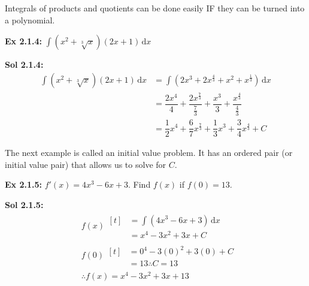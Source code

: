 Integrals of products and quotients can be done easily IF they can be turned into a polynomial. \par

\begin{tcolorbox}[example]
    \textbf{Ex 2.1.4: } $\int \left(x^2 + \sqrt[3]{x}\right)(2x + 1) \,\mathrm{d}x$
\end{tcolorbox}
\begin{tcolorbox}[solution]
    \textbf{Sol 2.1.4: } \begin{align*}
        \int \left(x^2 + \sqrt[3]{x}\right)(2x + 1) \,\mathrm{d}x &= \int \left(2x^3 + 2x^{\frac{4}{3}} + x^2 + x^{\frac{1}{3}}\right) \,\mathrm{d}x \\[11pt]
        & = \dfrac{2x^4}{4} + \dfrac{2x^{\frac{7}{3}}}{\frac{7}{3}} + \dfrac{x^3}{3} + \dfrac{x^{\frac{4}{3}}}{\frac{4}{3}} \\[11pt]
        & = \boxed{\dfrac{1}{2}x^4 + \dfrac{6}{7}x^{\frac{7}{3}} + \dfrac{1}{3}x^3 + \dfrac{3}{4}x^{\frac{4}{3}} + C}
    \end{align*}
\end{tcolorbox}

The next example is called an initial value problem. It has an ordered pair (or initial value pair) that allows us to solve for $C$. \par

\begin{tcolorbox}[example]
    \textbf{Ex 2.1.5: } $f'(x) = 4x^3 - 6x + 3$. Find $f(x)$ if $f(0) = 13$.
\end{tcolorbox} 
\begin{tcolorbox}[solution]
    \textbf{Sol 2.1.5: } \begin{align*}
        & f(x) \begin{aligned}[t]
            & = \int \left(4x^3 - 6x + 3\right) \,\mathrm{d}x \\[11pt]
            & = x^4 - 3x^2 + 3x + C 
        \end{aligned} \\[11pt]
        & f(0) \begin{aligned}[t]
            & = 0^4 - 3(0)^2 + 3(0) + C \\[11pt]
            & = 13 \therefore C = 13 
        \end{aligned} \\[11pt]
        & \therefore \boxed{f(x) = x^4 - 3x^2 + 3x + 13}
    \end{align*}
\end{tcolorbox}

